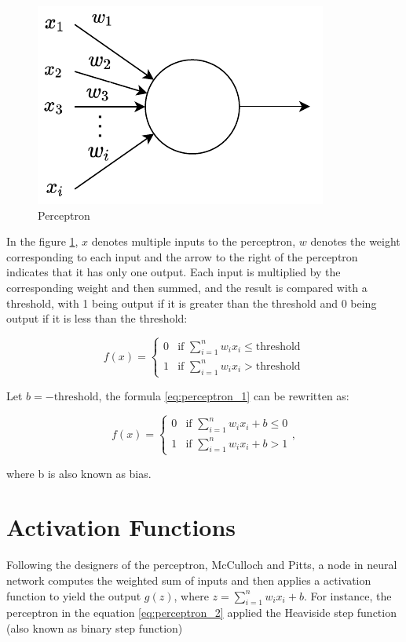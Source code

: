 \documentclass[
	parskip, 			   %
	twoside, 			   %
	DIV=14, 			   %
	BCOR=15.0mm, 		   %
	headsepline, 		   %
	open=right, 		   %
	captions=tableheading, %
	bibliography=totoc,    %
	numbers=noenddot       %
]{scrreprt}
\begin{document}
\begin{figure}[h!]
    \centering
    \includegraphics[scale=1]{figures/perceptron.pdf}
    \caption{Perceptron}
    \label{fig:perceptron}
\end{figure}

In the figure \ref{fig:perceptron}, $x$ denotes multiple inputs to the perceptron, $w$ denotes the weight corresponding to each input and the arrow to the right of the perceptron indicates that it has only one output. Each input is multiplied by the corresponding weight and then summed, and the result is compared with a threshold, with 1 being output if it is greater than the threshold and 0 being output if it is less than the threshold:

\begin{equation}
    \label{eq:perceptron_1}
    f(x)=\begin{cases}0 & \text{if } \sum\nolimits_{i=1}^n w_{i} x_{i} \leq \text{threshold} \\ 1 & \text{if } \sum\nolimits_{i=1}^n w_{i} x_{i}>\text{threshold}\end{cases}
\end{equation}

Let $b=-\text{threshold}$, the formula \ref{eq:perceptron_1} can be rewritten as:

\begin{equation}
    \label{eq:perceptron_2}
    f(x)=\begin{cases}0 & \text{if } \sum\nolimits_{i=1}^n w_{i} x_{i}+b \leq 0 \\ 1 & \text{if } \sum\nolimits_{i=1}^n w_{i} x_{i}+b>1\end{cases},
\end{equation}

where b is also known as bias. 

\section{Activation Functions}
Following the designers of the perceptron, McCulloch and Pitts, a node in neural network computes the weighted sum of inputs and then applies a activation function to yield the output $g(z)$, where $z=\sum\nolimits_{i=1}^n w_{i} x_{i} + b$. For instance, the perceptron in the equation \ref{eq:perceptron_2} applied the Heaviside step function (also known as binary step function) 
\end{document}
